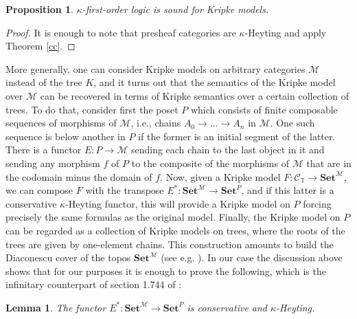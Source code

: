 \documentclass[a4paper,11pt]{article}
\theoremstyle{plain}
\newtheorem{lemma}[thm]{Lemma}
\newtheorem{proposition}[thm]{Proposition}
\theoremstyle{plain}
\theoremstyle{remark}
\newcommand{\synt}[2]{\ensuremath{\mathcal{#1}_{{#2}}}}
\newcommand{\Sets}{\ensuremath{\mathbf{Set}}}
\newcommand{\theory}{\ensuremath{\mathbb{T}}}
\begin{document}
\begin{proposition}  
$\kappa$-first-order logic is sound for Kripke models.
\end{proposition}

\begin{proof}
It is enough to note that presheaf categories are $\kappa$-Heyting and apply Theorem \ref{cc}.
\end{proof}


More generally, one can consider Kripke models on arbitrary categories $\mathcal{M}$ instead of the tree $K$, and it turns out that the semantics of the Kripke model over $\mathcal{M}$ can be recovered in terms of Kripke semantics over a certain collection of trees. To do that, consider first the poset $P$ which consists of finite composable sequences of morphisms of $\mathcal{M}$, i.e., chains $A_0 \to ... \to A_n$ in $\mathcal{M}$. One such sequence is below another in $P$ if the former is an initial segment of the latter. There is a functor $E:P \to \mathcal{M}$ sending each chain to the last object in it and sending any morphism $f$ of $P$ to the composite of the morphisms of $\mathcal{M}$ that are in the codomain minus the domain of $f$. Now, given a Kripke model $F: \synt{C}{\theory}\to \Sets^{\mathcal{M}}$, we can compose $F$ with the transpose $E^*: \Sets^{\mathcal{M}} \to \Sets^{P}$, and if this latter is a conservative $\kappa$-Heyting functor, this will provide a Kripke model on $P$ forcing precisely the same formulas as the original model. Finally, the Kripke model on $P$ can be regarded as a collection of Kripke models on trees, where the roots of the trees are given by one-element chains. This construction amounts to build the Diaconescu cover of the topos $\Sets^{\mathcal{M}}$ (see e.g. \cite{maclane-moerdijk}). In our case the discussion above shows that for our purposes it is enough to prove the following, which is the infinitary counterpart of section 1.744 of \cite{fs}:

\begin{lemma}
 The functor $E^*: \Sets^{\mathcal{M}} \to \Sets^{P}$ is conservative and $\kappa$-Heyting.
\end{lemma}
\end{document}

